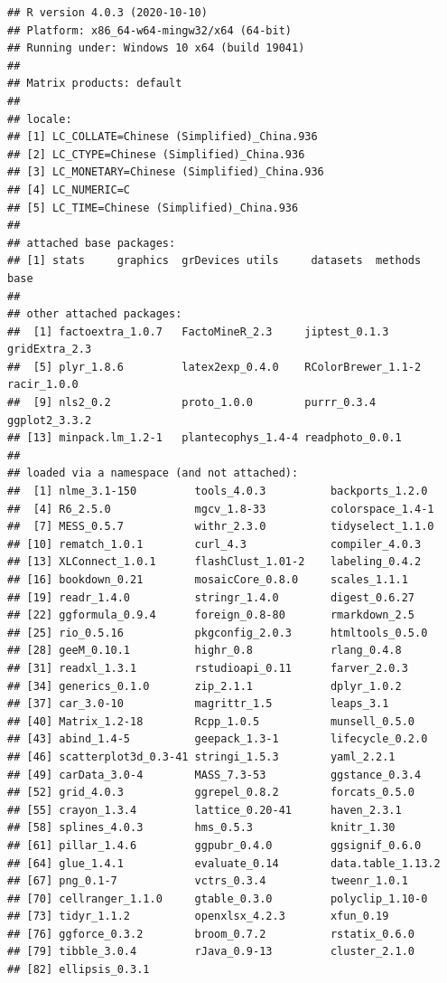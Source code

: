 \documentclass[
]{krantz}
\begin{document}
\begin{verbatim}
## R version 4.0.3 (2020-10-10)
## Platform: x86_64-w64-mingw32/x64 (64-bit)
## Running under: Windows 10 x64 (build 19041)
## 
## Matrix products: default
## 
## locale:
## [1] LC_COLLATE=Chinese (Simplified)_China.936 
## [2] LC_CTYPE=Chinese (Simplified)_China.936   
## [3] LC_MONETARY=Chinese (Simplified)_China.936
## [4] LC_NUMERIC=C                              
## [5] LC_TIME=Chinese (Simplified)_China.936    
## 
## attached base packages:
## [1] stats     graphics  grDevices utils     datasets  methods   base     
## 
## other attached packages:
##  [1] factoextra_1.0.7   FactoMineR_2.3     jiptest_0.1.3      gridExtra_2.3     
##  [5] plyr_1.8.6         latex2exp_0.4.0    RColorBrewer_1.1-2 racir_1.0.0       
##  [9] nls2_0.2           proto_1.0.0        purrr_0.3.4        ggplot2_3.3.2     
## [13] minpack.lm_1.2-1   plantecophys_1.4-4 readphoto_0.0.1   
## 
## loaded via a namespace (and not attached):
##  [1] nlme_3.1-150         tools_4.0.3          backports_1.2.0     
##  [4] R6_2.5.0             mgcv_1.8-33          colorspace_1.4-1    
##  [7] MESS_0.5.7           withr_2.3.0          tidyselect_1.1.0    
## [10] rematch_1.0.1        curl_4.3             compiler_4.0.3      
## [13] XLConnect_1.0.1      flashClust_1.01-2    labeling_0.4.2      
## [16] bookdown_0.21        mosaicCore_0.8.0     scales_1.1.1        
## [19] readr_1.4.0          stringr_1.4.0        digest_0.6.27       
## [22] ggformula_0.9.4      foreign_0.8-80       rmarkdown_2.5       
## [25] rio_0.5.16           pkgconfig_2.0.3      htmltools_0.5.0     
## [28] geeM_0.10.1          highr_0.8            rlang_0.4.8         
## [31] readxl_1.3.1         rstudioapi_0.11      farver_2.0.3        
## [34] generics_0.1.0       zip_2.1.1            dplyr_1.0.2         
## [37] car_3.0-10           magrittr_1.5         leaps_3.1           
## [40] Matrix_1.2-18        Rcpp_1.0.5           munsell_0.5.0       
## [43] abind_1.4-5          geepack_1.3-1        lifecycle_0.2.0     
## [46] scatterplot3d_0.3-41 stringi_1.5.3        yaml_2.2.1          
## [49] carData_3.0-4        MASS_7.3-53          ggstance_0.3.4      
## [52] grid_4.0.3           ggrepel_0.8.2        forcats_0.5.0       
## [55] crayon_1.3.4         lattice_0.20-41      haven_2.3.1         
## [58] splines_4.0.3        hms_0.5.3            knitr_1.30          
## [61] pillar_1.4.6         ggpubr_0.4.0         ggsignif_0.6.0      
## [64] glue_1.4.1           evaluate_0.14        data.table_1.13.2   
## [67] png_0.1-7            vctrs_0.3.4          tweenr_1.0.1        
## [70] cellranger_1.1.0     gtable_0.3.0         polyclip_1.10-0     
## [73] tidyr_1.1.2          openxlsx_4.2.3       xfun_0.19           
## [76] ggforce_0.3.2        broom_0.7.2          rstatix_0.6.0       
## [79] tibble_3.0.4         rJava_0.9-13         cluster_2.1.0       
## [82] ellipsis_0.3.1
\end{verbatim}

\cleardoublepage

  

\backmatter
\printindex
\end{document}
